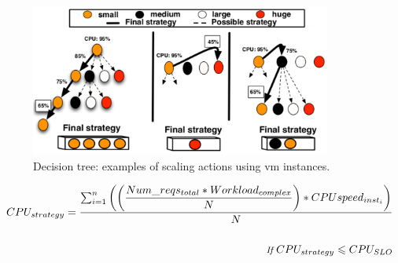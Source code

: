 \begin{figure}[htb]
  \begin{center}
    \includegraphics[width=\linewidth,height=5cm]{images/scalingTree}
  \end{center}
\vspace{-5mm}
  \caption{Decision tree: examples of scaling actions using vm instances.}
  \label{fig:scalingTree}
\end{figure}




{\scriptsize
\begin{equation}\label{resource_combination}
\begin{split}
CPU_{strategy} = \dfrac{ \sum_{i=1}^n \bigg( \bigg( \dfrac{ Num\_reqs_{total} * Workload_{complex} }  {N}  \bigg) * CPU speed_{inst_{i}} \bigg) }  {N} \\ 
\\ {\small \textit{ If } CPU_{strategy} \leqslant CPU_{SLO} }
\end{split}
\end{equation}
}

